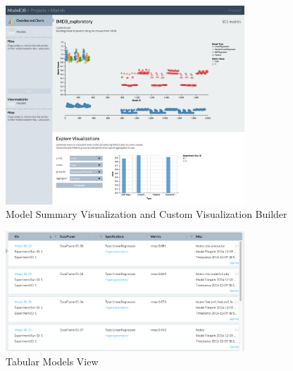 \documentclass[11pt]{article}
\begin{document}

\begin{figure}
  \centering
  \includegraphics[trim=0mm 0mm 0mm 0mm,
  clip=true, width=0.8\textwidth]{figs/mdb_model_timeline.png}
  \caption{\label{fig:mdb_model_timeline} Model Summary Visualization and Custom Visualization Builder}
\end{figure}



\begin{figure}
  \centering
  \includegraphics[trim=0mm 0mm 0mm 0mm,
  clip=true, width=0.8\textwidth]{figs/mdb_tabular.png}
  \caption{\label{fig:tabular-view} Tabular Models View}
\end{figure}
\end{document}
